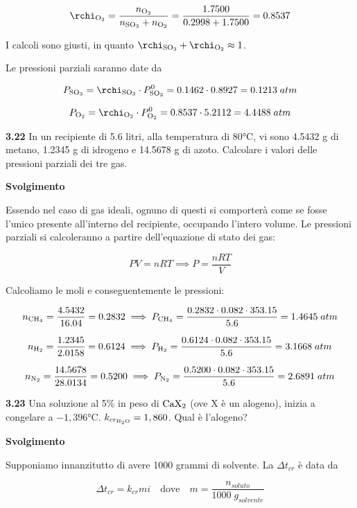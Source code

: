 $$\rchi_{\rm O_2}=\frac{n_{\rm O_2}}{n_{\rm SO_3} + n_{\rm O_2}}=\frac{1.7500}{0.2998 + 1.7500}=0.8537$$

I calcoli sono giusti, in quanto $\rchi_{\rm SO_3} + \rchi_{\rm O_2} \approx 1$.

Le pressioni parziali saranno date da

$$P_{\rm SO_3}=\rchi_{\rm SO_3} \cdot P^0_{\rm SO_3}
=0.1462 \cdot 0.8927=0.1213\;atm$$

$$P_{\rm O_2}=\rchi_{\rm O_2} \cdot P^0_{\rm O_2}
=0.8537 \cdot 5.2112=4.4488\;atm$$

\vspace{0.2cm}\textbf{3.22} In un recipiente di 5.6 litri, alla temperatura di 80°C, vi sono 4.5432 g di metano, 1.2345 g di idrogeno e 14.5678 g di azoto. Calcolare i valori delle pressioni parziali dei tre gas. 

\vspace{0.2cm}\large\textbf{Svolgimento}\normalsize

\vspace{0.2cm}Essendo nel caso di gas ideali, ognuno di questi si comporterà come se fosse l'unico presente all'interno del recipiente, occupando l'intero volume. Le pressioni parziali si calcoleranno a partire dell'equazione di stato dei gas:

$$PV=nRT
\implies
P=\frac{nRT}{V}$$

Calcoliamo le moli e conseguentemente le pressioni:

$$n_{\rm CH_4}=\frac{4.5432}{16.04}=0.2832
\implies
P_{\rm CH_4}=\frac{0.2832 \cdot 0.082 \cdot 353.15}{5.6}=1.4645\;atm$$

$$n_{\rm H_2}=\frac{1.2345}{2.0158}=0.6124
\implies
P_{\rm H_2}=\frac{0.6124 \cdot 0.082 \cdot 353.15}{5.6}=3.1668\;atm$$

$$n_{\rm N_2}=\frac{14.5678}{28.0134}=0.5200
\implies
P_{\rm N_2}=\frac{0.5200 \cdot 0.082 \cdot 353.15}{5.6}=2.6891\;atm$$

\vspace{0.2cm}\textbf{3.23} Una soluzione al 5\% in peso di $\rm CaX_2$ (ove X è un alogeno), inizia a congelare a $-1,396$°C. $k_{cr_{\rm H_2O}} = 1,860$. Qual è l'alogeno? 

\vspace{0.2cm}\large\textbf{Svolgimento}\normalsize

\vspace{0.2cm}Supponiamo innanzitutto di avere 1000 grammi di solvente. La $\Delta t_{cr}$ è data da

$$\Delta t_{cr}=k_{cr} m i
\quad\text{dove}\quad
m=\frac{n_{soluto}}{1000\;g_{solvente}}$$

